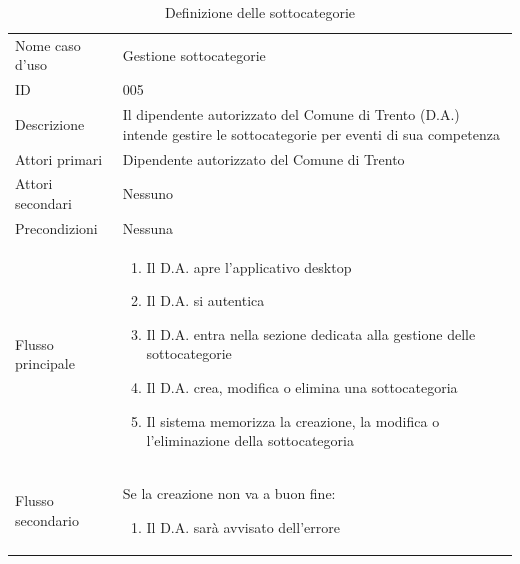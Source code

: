 \documentclass{article}
\begin{document}
\begin{table}[htbp]
    \label{8.3.1}
    \centering
    \begin{tabularx}{\textwidth}{| l | p{} |}
        \Xhline{2pt} %
        Nome caso d'uso & Gestione sottocategorie \\
        \Xhline{2pt} %
        ID & 005 \\
        \hline
        Descrizione & Il dipendente autorizzato del Comune di Trento (D.A.) intende gestire le sottocategorie per eventi di sua competenza\\
        \hline
        Attori primari & Dipendente autorizzato del Comune di Trento\\
        \hline
        Attori secondari & Nessuno \\
        \hline
        Precondizioni & Nessuna \\
        \hline
        Flusso principale & 
        \begin{enumerate}[topsep=5pt,partopsep=0pt,parsep=0pt,itemsep=0pt,before=\vspace{-\baselineskip},after=\vspace{-\baselineskip}]                
            \item Il D.A. apre l'applicativo desktop
            \item Il D.A. si autentica
            \item Il D.A. entra nella sezione dedicata alla gestione delle sottocategorie
            \item Il D.A. crea, modifica o elimina una sottocategoria
            \item Il sistema memorizza la creazione, la modifica o l'eliminazione della sottocategoria
        \end{enumerate}
        \\
        \hline
        Flusso secondario & 
        Se la creazione non va a buon fine:
        \begin{enumerate}[topsep=10pt,partopsep=0pt,parsep=0pt,itemsep=0pt,before=\vspace{-\baselineskip},after=\vspace{-\baselineskip}]                
            \item Il D.A. sarà avvisato dell'errore
        \end{enumerate}
        \\
        \hline
    \end{tabularx}
    \caption{Definizione delle sottocategorie}
    \label{tab:tabella_use_case006}
\end{table}
\end{document}
